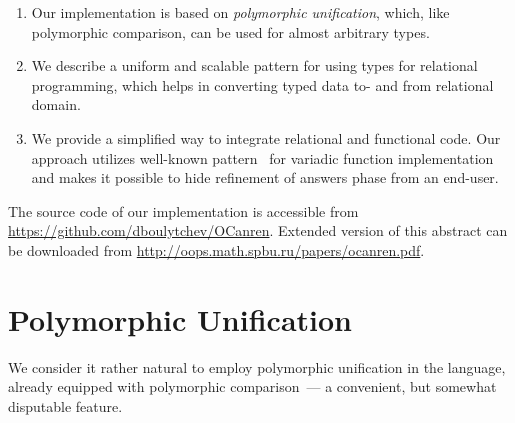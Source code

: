 \documentclass[10pt, oneside, nocopyrightspace]{sigplanconf}
\begin{document}
\begin{enumerate}
\item Our implementation is based on \emph{polymorphic unification}, which, like polymorphic comparison,
can be used for almost arbitrary types. 

\begin{comment}
The implementation of polymorphic unification uses unsafe features and
relies on intrinsic knowledge of runtime representation of values; we show, however, that this does not
compromise type safety. Practically, we applied purely \emph{ad hoc} approach since the features, 
which would provide less \emph{ad hoc} solution are not yet integrated into the mainstream language.
\end{comment}

\item We describe a uniform and scalable pattern for using types for relational programming, which
helps in converting typed data to- and from relational domain. 

\begin{comment}
With this pattern, only one
generic feature (``\lstinline{map/morphism/Functor}'') is needed, and thus virtually any generic 
framework for OCaml can be used. Despite being rather a pragmatic observation, this pattern, as we
believe, would lead to a more regular and easy to maintain relational specifications.
\end{comment}

\item We provide a simplified way to integrate relational and functional code. Our approach utilizes
well-known pattern~\cite{Unparsing, DoWeNeed} for variadic function implementation and makes it
possible to hide refinement of answers phase from an end-user.
\end{enumerate}

The source code of our implementation is accessible from \url{https://github.com/dboulytchev/OCanren}.
Extended version of this abstract can be downloaded from \url{http://oops.math.spbu.ru/papers/ocanren.pdf}.

\section{Polymorphic Unification}
\label{polyuni}

We consider it rather natural to employ polymorphic unification in the
language, already equipped with polymorphic comparison~--- a convenient, but
somewhat disputable
feature. 
\end{document}
